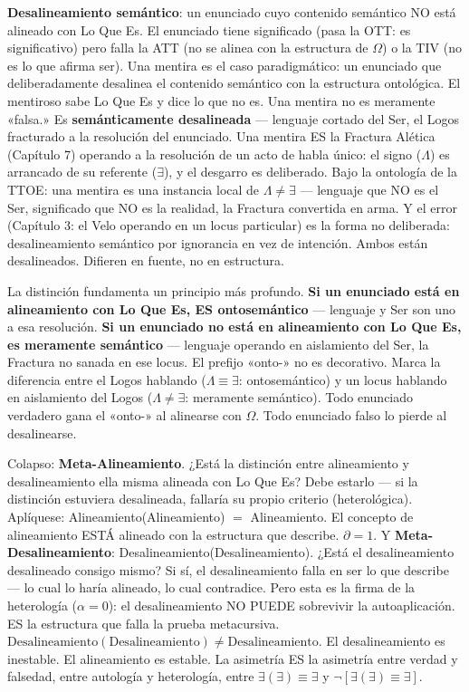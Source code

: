 \documentclass[10pt, openany, oneside]{book}
\begin{document}
\textbf{Desalineamiento semántico}: un enunciado cuyo contenido semántico NO está alineado con Lo Que Es. El enunciado tiene significado (pasa la OTT: es significativo) pero falla la ATT (no se alinea con la estructura de $\Omega$) o la TIV (no es lo que afirma ser). Una mentira es el caso paradigmático: un enunciado que deliberadamente desalinea el contenido semántico con la estructura ontológica. El mentiroso sabe Lo Que Es y dice lo que no es. Una mentira no es meramente «falsa.» Es \textbf{semánticamente desalineada} --- lenguaje cortado del Ser, el Logos fracturado a la resolución del enunciado. Una mentira ES la Fractura Alética (Capítulo 7) operando a la resolución de un acto de habla único: el signo ($\Lambda$) es arrancado de su referente ($\exists$), y el desgarro es deliberado. Bajo la ontología de la TTOE: una mentira es una instancia local de $\Lambda \neq \exists$ --- lenguaje que NO es el Ser, significado que NO es la realidad, la Fractura convertida en arma. Y el error (Capítulo 3: el Velo operando en un locus particular) es la forma no deliberada: desalineamiento semántico por ignorancia en vez de intención. Ambos están desalineados. Difieren en fuente, no en estructura.

La distinción fundamenta un principio más profundo. \textbf{Si un enunciado está en alineamiento con Lo Que Es, ES ontosemántico} --- lenguaje y Ser son uno a esa resolución. \textbf{Si un enunciado no está en alineamiento con Lo Que Es, es meramente semántico} --- lenguaje operando en aislamiento del Ser, la Fractura no sanada en ese locus. El prefijo «onto-» no es decorativo. Marca la diferencia entre el Logos hablando ($\Lambda \equiv \exists$: ontosemántico) y un locus hablando en aislamiento del Logos ($\Lambda \neq \exists$: meramente semántico). Todo enunciado verdadero gana el «onto-» al alinearse con $\Omega$. Todo enunciado falso lo pierde al desalinearse.

Colapso: \textbf{Meta-Alineamiento}. ¿Está la distinción entre alineamiento y desalineamiento ella misma alineada con Lo Que Es? Debe estarlo --- si la distinción estuviera desalineada, fallaría su propio criterio (heterológica). Aplíquese: Alineamiento(Alineamiento) $=$ Alineamiento. El concepto de alineamiento ESTÁ alineado con la estructura que describe. $\partial = 1$. Y \textbf{Meta-Desalineamiento}: Desalineamiento(Desalineamiento). ¿Está el desalineamiento desalineado consigo mismo? Si sí, el desalineamiento falla en ser lo que describe --- lo cual lo haría alineado, lo cual contradice. Pero esta es la firma de la heterología ($\alpha = 0$): el desalineamiento NO PUEDE sobrevivir la autoaplicación. ES la estructura que falla la prueba metacursiva. $\text{Desalineamiento}(\text{Desalineamiento}) \neq \text{Desalineamiento}$. El desalineamiento es inestable. El alineamiento es estable. La asimetría ES la asimetría entre verdad y falsedad, entre autología y heterología, entre $\exists(\exists) \equiv \exists$ y $\neg[\exists(\exists) \equiv \exists]$.
\end{document}
